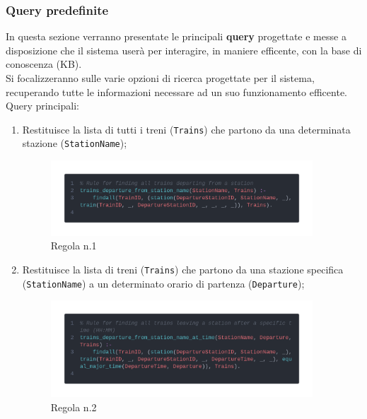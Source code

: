\documentclass[italian,12pt,a4paper]{article}
\begin{document}
	\subsubsection{Query predefinite}
	In questa sezione verranno presentate le principali \textbf{query} progettate e messe a disposizione che il sistema userà per interagire, in maniere efficente, con la base di conoscenza (KB).\\
	\linebreak
	Si focalizzeranno sulle varie opzioni di ricerca progettate per il sistema, recuperando tutte le informazioni necessare ad un suo funzionamento efficente. \\
	\linebreak
	Query principali:
	
	
	\begin{enumerate}
		\item Restituisce la lista di tutti i treni (\texttt{Trains}) che partono da una determinata stazione (\texttt{StationName});
			\begin{figure}[h]
				\centering
				\includegraphics[width=370px]{img/code1}
				\caption{Regola n.1}
			\end{figure}
			
		\item Restituisce la lista di treni (\texttt{Trains}) che partono da una stazione specifica (\texttt{StationName}) a un determinato orario di partenza (\texttt{Departure});
			\begin{figure}[h]
				\centering
				\includegraphics[width=370px]{img/code2}
				\caption{Regola n.2}


\end{figure}
\end{enumerate}
\end{document}

